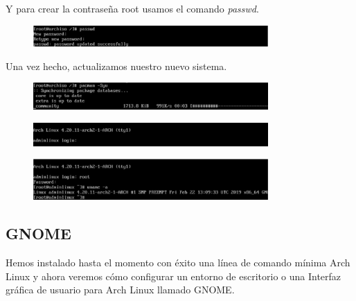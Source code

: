 \documentclass[11pt,letterpaper]{article}
\begin{document}
Y para crear la contraseña root usamos el comando \textit{passwd}.

\begin{figure}[H]
        \centering
        \includegraphics[width=0.8\textwidth]{img/25.png}
        \label{img:Imagen 4}
\end{figure}
Una vez hecho, actualizamos nuestro nuevo sistema. 
\begin{figure}[H]
        \centering
        \includegraphics[width=0.8\textwidth]{img/26.png}
        \label{img:Imagen 4}
\end{figure}
\begin{figure}[H]
        \centering
        \includegraphics[width=0.8\textwidth]{img/27.png}
        \label{img:Imagen 4}
\end{figure}
\begin{figure}[H]
        \centering
        \includegraphics[width=0.8\textwidth]{img/28.png}
        \label{img:Imagen 4}
\end{figure}

\subsection{GNOME}

Hemos instalado hasta el momento con éxito una línea de comando mínima Arch Linux y ahora veremos cómo configurar un entorno de escritorio o una Interfaz gráfica de usuario para Arch Linux llamado GNOME.
\end{document}
